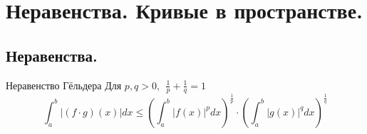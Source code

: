 
\section{Неравенства. Кривые в пространстве.}

\subsection{Неравенства.}

\begin{Theorem}{Неравенство Гёльдера}{}
    Для $p, q > 0, \ \ \frac{1}{p} + \frac{1}{q} = 1$
    \[
    \int^b_a | (f \cdot g) (x) | dx \le \left(\int^b_a |f(x)|^p dx \right)^\frac{1}{p} \cdot \left(\int^b_a |g(x)|^q dx \right)^\frac{1}{q}
    \]
\end{Theorem}
